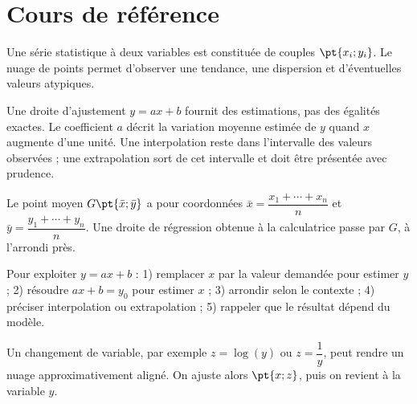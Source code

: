 
\section{Cours de référence}
Une série statistique à deux variables est constituée de couples $\pt{x_i;y_i}$. Le nuage de points permet d'observer une tendance, une dispersion et d'éventuelles valeurs atypiques.

\begin{center}
\end{center}

\begin{keypoint}
Une droite d'ajustement $y=ax+b$ fournit des estimations, pas des égalités exactes. Le coefficient $a$ décrit la variation moyenne estimée de $y$ quand $x$ augmente d'une unité. Une interpolation reste dans l'intervalle des valeurs observées ; une extrapolation sort de cet intervalle et doit être présentée avec prudence.
\end{keypoint}

Le point moyen $G\pt{\bar x;\bar y}$ a pour coordonnées $\bar x=\dfrac{x_1+\cdots+x_n}{n}$ et $\bar y=\dfrac{y_1+\cdots+y_n}{n}$. Une droite de régression obtenue à la calculatrice passe par $G$, à l'arrondi près.

\begin{method}
Pour exploiter $y=ax+b$ : 1) remplacer $x$ par la valeur demandée pour estimer $y$ ; 2) résoudre $ax+b=y_0$ pour estimer $x$ ; 3) arrondir selon le contexte ; 4) préciser interpolation ou extrapolation ; 5) rappeler que le résultat dépend du modèle.
\end{method}

Un changement de variable, par exemple $z=\log(y)$ ou $z=\dfrac1y$, peut rendre un nuage approximativement aligné. On ajuste alors $\pt{x;z}$, puis on revient à la variable $y$.

